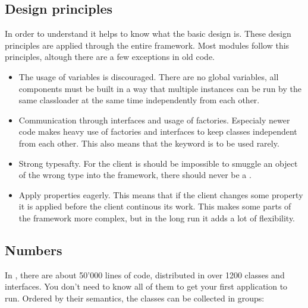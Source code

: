

\subsection{Design principles}
In order to understand  it helps to know what the basic design is. These design principles are applied through the entire framework. Most modules follow this principles, altough there are a few exceptions in old code.

\begin{itemize}
 \item The usage of  variables is discouraged. There are no global variables, all components must be built in a way that multiple instances can be run by the same classloader at the same time independently from each other.
 \item Communication through interfaces and usage of factories. Especialy newer code makes heavy use of factories and interfaces to keep classes independent from each other. This also means that the keyword  is to be used rarely.
 \item Strong typesafty. For the client is should be impossible to smuggle an object of the wrong type into the framework, there should never be a .
 \item Apply properties eagerly. This means that if the client changes some property it is applied before the client continous its work. This makes some parts of the framework more complex, but in the long run it adds a lot of flexibility.
\end{itemize}

\subsection{Numbers}
In , there are about 50'000 lines of code, distributed in over 1200 classes and interfaces. You don't need to know all of them to get your first application to run. Ordered by their semantics, the classes can be collected in groups:

